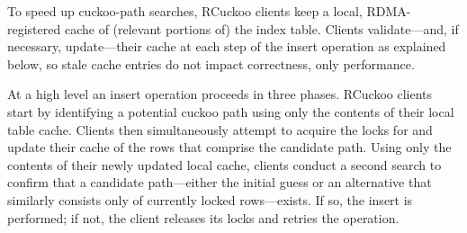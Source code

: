 To speed up cuckoo-path searches, RCuckoo clients keep a local,
RDMA-registered cache of (relevant portions of) the index table.
Clients validate---and, if necessary, update---their cache at each
step of the insert operation as explained below, so stale cache
entries do not impact correctness, only performance.







At a high level an insert operation proceeds in three phases.  RCuckoo
clients start by identifying a potential cuckoo path using only the
contents of their local table cache.  Clients then simultaneously
attempt to acquire the locks for and update their cache of the rows
that comprise the candidate path.  Using only the contents of their
newly updated local cache, clients conduct a second search to confirm
that a candidate path---either the initial guess or an alternative
that similarly consists only of currently locked rows---exists.  If
so, the insert is performed; if not, the client releases its locks and
retries the operation.

